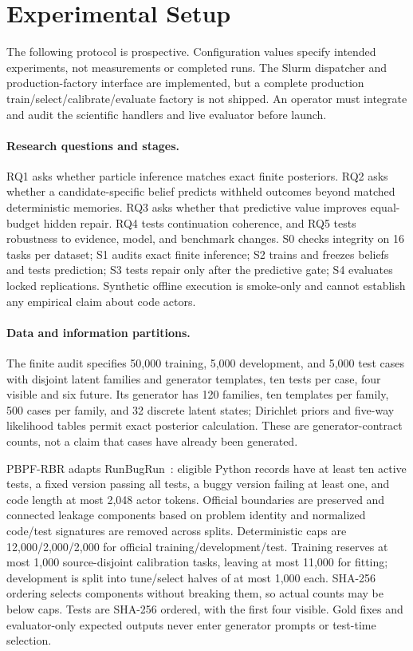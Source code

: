 \section{Experimental Setup}
\label{sec:setup}
The following protocol is prospective. Configuration values specify intended
experiments, not measurements or completed runs. The Slurm dispatcher and
production-factory interface are implemented, but a complete production
train/select/calibrate/evaluate factory is not shipped. An operator must
integrate and audit the scientific handlers and live evaluator before launch.

\paragraph{Research questions and stages.}
RQ1 asks whether particle inference matches exact finite posteriors. RQ2 asks
whether a candidate-specific belief predicts withheld outcomes beyond matched
deterministic memories. RQ3 asks whether that predictive value improves
equal-budget hidden repair. RQ4 tests continuation coherence, and RQ5 tests
robustness to evidence, model, and benchmark changes. S0 checks integrity on
16 tasks per dataset; S1 audits exact finite inference; S2 trains and freezes
beliefs and tests prediction; S3 tests repair only after the predictive gate;
S4 evaluates locked replications. Synthetic offline execution is smoke-only
and cannot establish any empirical claim about code actors.

\paragraph{Data and information partitions.}
The finite audit specifies 50,000 training, 5,000 development, and 5,000 test
cases with disjoint latent families and generator templates, ten tests per
case, four visible and six future. Its generator has 120 families, ten
templates per family, 500 cases per family, and 32 discrete latent states;
Dirichlet priors and five-way likelihood tables permit exact posterior
calculation. These are generator-contract counts, not a claim that cases have
already been generated.

PBPF-RBR adapts RunBugRun~\citep{runbugrun}: eligible Python records have at
least ten active tests, a fixed version passing all tests, a buggy version
failing at least one, and code length at most 2,048 actor tokens. Official
boundaries are preserved and connected leakage components based on problem
identity and normalized code/test signatures are removed across splits.
Deterministic caps are 12,000/2,000/2,000 for official training/development/test.
Training reserves at most 1,000 source-disjoint calibration tasks, leaving at
most 11,000 for fitting; development is split into tune/select halves of at
most 1,000 each. SHA-256 ordering selects components without breaking them,
so actual counts may be below caps. Tests are SHA-256 ordered, with the first
four visible. Gold fixes and evaluator-only expected outputs never enter
generator prompts or test-time selection.

